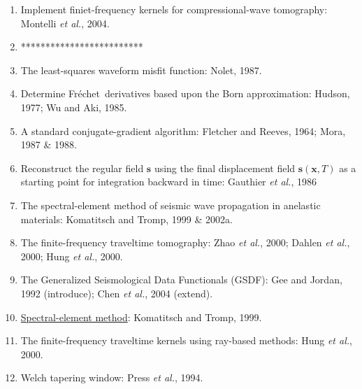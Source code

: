 \documentclass{article}
\newcommand{\sline}{*************************}
\newcommand{\mbf}[1]{\mathbf{#1}}
\newcommand{\myem}[1]{{\color{red}\uline{#1}}}
\newcommand{\Frechet}{Fr\'{e}chet~}
\newcommand{\etal}{\textit{et al.}}
\begin{document}
\begin{enumerate}[\hspace{10mm}*]
  \item Implement finiet-frequency kernels for compressional-wave tomography: Montelli \etal, 2004.
  \item \sline
  \item The least-squares waveform misfit function: Nolet, 1987.
  \item Determine \Frechet derivatives based upon the Born approximation: Hudson, 1977; Wu and Aki, 1985.
  \item A standard conjugate-gradient algorithm: Fletcher and Reeves, 1964; Mora, 1987 \& 1988.
  \item Reconstruct the regular field $\mbf s$ using the final displacement field $\mbf s(\mbf x,T)$ as a starting point for integration backward in time: Gauthier \etal, 1986
  \item The spectral-element method of seismic wave propagation in anelastic materials: Komatitsch and Tromp, 1999 \& 2002a.
  \item The finite-frequency traveltime tomography: Zhao \etal, 2000; Dahlen \etal, 2000; Hung \etal, 2000.
  \item The Generalized Seismological Data Functionals (GSDF): Gee and Jordan, 1992 (introduce); Chen \etal, 2004 (extend).
  \item \myem{Spectral-element method}: Komatitsch and Tromp, 1999.
  \item The finite-frequency traveltime kernels using ray-based methods: Hung \etal, 2000.
  \item Welch tapering window: Press \etal, 1994.
\end{enumerate}\par
\end{document}
